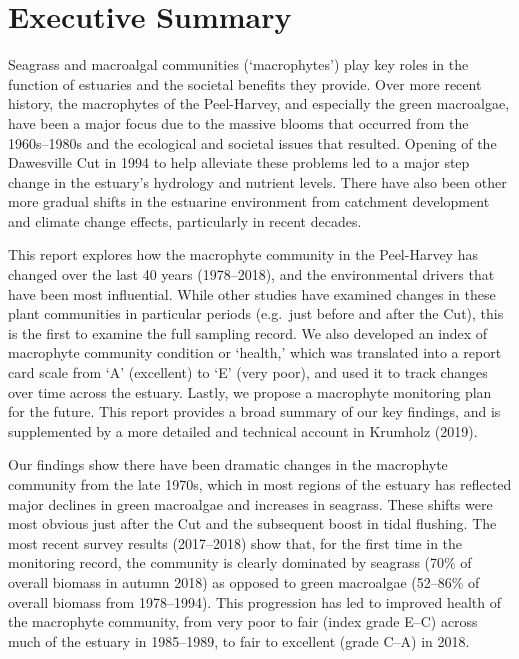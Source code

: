 \documentclass[
]{book}
\begin{document}
\hypertarget{executive-summary-2}{%
\section{Executive Summary}\label{executive-summary-2}}

Seagrass and macroalgal communities (`macrophytes') play key roles in the function of estuaries and the societal benefits they provide. Over more recent history, the macrophytes of the Peel-Harvey, and especially the green macroalgae, have been a major focus due to the massive blooms that occurred from the 1960s--1980s and the ecological and societal issues that resulted. Opening of the Dawesville Cut in 1994 to help alleviate these problems led to a major step change in the estuary's hydrology and nutrient levels. There have also been other more gradual shifts in the estuarine environment from catchment development and climate change effects, particularly in recent decades.

This report explores how the macrophyte community in the Peel-Harvey has changed over the last 40 years (1978--2018), and the environmental drivers that have been most influential. While other studies have examined changes in these plant communities in particular periods (e.g.~just before and after the Cut), this is the first to examine the full sampling record. We also developed an index of macrophyte community condition or `health,' which was translated into a report card scale from `A' (excellent) to `E' (very poor), and used it to track changes over time across the estuary. Lastly, we propose a macrophyte monitoring plan for the future. This report provides a broad summary of our key findings, and is supplemented by a more detailed and technical account in Krumholz (2019).

Our findings show there have been dramatic changes in the macrophyte community from the late 1970s, which in most regions of the estuary has reflected major declines in green macroalgae and increases in seagrass. These shifts were most obvious just after the Cut and the subsequent boost in tidal flushing. The most recent survey results (2017--2018) show that, for the first time in the monitoring record, the community is clearly dominated by seagrass (70\% of overall biomass in autumn 2018) as opposed to green macroalgae (52--86\% of overall biomass from 1978--1994). This progression has led to improved health of the macrophyte community, from very poor to fair (index grade E--C) across much of the estuary in 1985--1989, to fair to excellent (grade C--A) in 2018.
\end{document}
